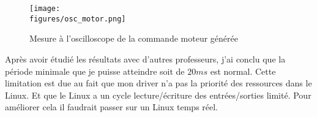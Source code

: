 \begin{figure}[H]
    \centering
    \texttt{[image: \\figures/osc\_motor.png]}
    \decoRule
    \caption[
    Mesure à l'oscilloscope de la commande moteur générée]{
	Mesure à l'oscilloscope de la commande moteur générée}
    \label{fig:Mesure à l'oscilloscope de la commande moteur générée}
    \end{figure}

\vspace{1cm}

Après avoir étudié les résultats avec d'autres professeurs, j'ai conclu que la période minimale que je puisse atteindre soit de $20ms$ est normal. Cette limitation est due au fait que mon driver n'a pas la priorité des ressources dans le Linux. Et que le Linux a un cycle lecture/écriture des entrées/sorties limité. Pour améliorer cela il faudrait passer sur un Linux temps réel.


